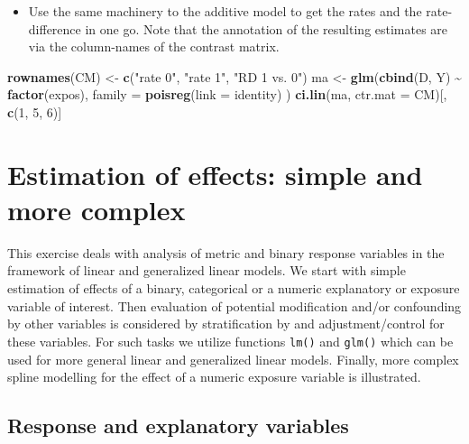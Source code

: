 \documentclass[
]{book}
\newenvironment{Shaded}{\begin{snugshade}}{\end{snugshade}}
\newcommand{\AttributeTok}[1]{\textcolor[rgb]{0.13,0.29,0.53}{#1}}
\newcommand{\DecValTok}[1]{\textcolor[rgb]{0.00,0.00,0.81}{#1}}
\newcommand{\FunctionTok}[1]{\textcolor[rgb]{0.13,0.29,0.53}{\textbf{#1}}}
\newcommand{\NormalTok}[1]{#1}
\newcommand{\OtherTok}[1]{\textcolor[rgb]{0.56,0.35,0.01}{#1}}
\newcommand{\SpecialCharTok}[1]{\textcolor[rgb]{0.81,0.36,0.00}{\textbf{#1}}}
\newcommand{\StringTok}[1]{\textcolor[rgb]{0.31,0.60,0.02}{#1}}
\providecommand{\tightlist}{%
  \setlength{\itemsep}{0pt}\setlength{\parskip}{0pt}}
\begin{document}
\begin{itemize}
\tightlist
\item
  Use the same machinery to the additive model to get the rates
  and the rate-difference in one go. Note that the annotation of the
  resulting estimates are via the column-names of the contrast matrix.
\end{itemize}

\begin{Shaded}
\begin{Highlighting}[]
\FunctionTok{rownames}\NormalTok{(CM) }\OtherTok{\textless{}{-}} \FunctionTok{c}\NormalTok{(}\StringTok{"rate 0"}\NormalTok{, }\StringTok{"rate 1"}\NormalTok{, }\StringTok{"RD 1 vs. 0"}\NormalTok{)}
\NormalTok{ma }\OtherTok{\textless{}{-}} \FunctionTok{glm}\NormalTok{(}\FunctionTok{cbind}\NormalTok{(D, Y) }\SpecialCharTok{\textasciitilde{}} \FunctionTok{factor}\NormalTok{(expos),}
  \AttributeTok{family =} \FunctionTok{poisreg}\NormalTok{(}\AttributeTok{link =}\NormalTok{ identity)}
\NormalTok{)}
\FunctionTok{ci.lin}\NormalTok{(ma, }\AttributeTok{ctr.mat =}\NormalTok{ CM)[, }\FunctionTok{c}\NormalTok{(}\DecValTok{1}\NormalTok{, }\DecValTok{5}\NormalTok{, }\DecValTok{6}\NormalTok{)]}
\end{Highlighting}
\end{Shaded}

\chapter{Estimation of effects: simple and more complex}\label{estimation-of-effects-simple-and-more-complex}

This exercise deals with analysis of metric and binary
response variables in the framework of linear and
generalized linear models.
We start with simple estimation of effects of a binary, categorical or
a numeric explanatory or exposure variable of interest.
Then evaluation of potential modification and/or confounding by other variables
is considered by stratification by and adjustment/control for these variables.
For such tasks we utilize functions \texttt{lm()} and \texttt{glm()}
which can be used for more
general linear and generalized linear models. Finally, more complex
spline modelling for the effect of a numeric exposure variable is
illustrated.

\section{Response and explanatory variables}\label{response-and-explanatory-variables}
\end{document}

